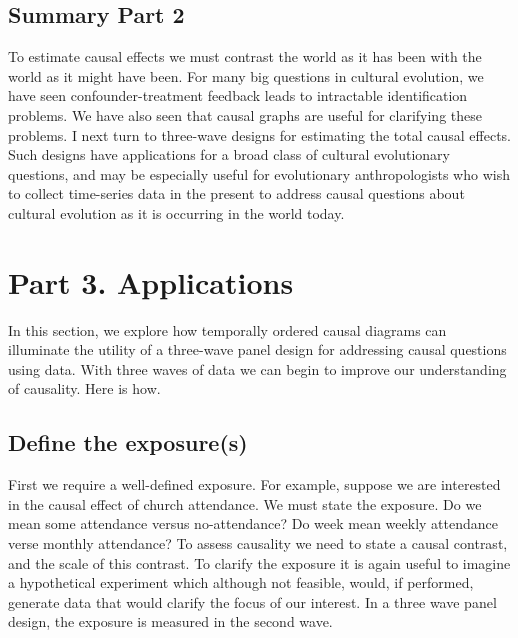 \documentclass[
  singlecolumn]{report}
\begin{document}
\hypertarget{summary-part-2}{%
\subsection{Summary Part 2}\label{summary-part-2}}

To estimate causal effects we must contrast the world as it has been
with the world as it might have been. For many big questions in cultural
evolution, we have seen confounder-treatment feedback leads to
intractable identification problems. We have also seen that causal
graphs are useful for clarifying these problems. I next turn to
three-wave designs for estimating the total causal effects. Such designs
have applications for a broad class of cultural evolutionary questions,
and may be especially useful for evolutionary anthropologists who wish
to collect time-series data in the present to address causal questions
about cultural evolution as it is occurring in the world today.

\hypertarget{part-3.-applications}{%
\section{Part 3. Applications}\label{part-3.-applications}}

In this section, we explore how temporally ordered causal diagrams can
illuminate the utility of a three-wave panel design for addressing
causal questions using data. With three waves of data we can begin to
improve our understanding of causality. Here is how.

\hypertarget{define-the-exposures}{%
\subsection{\texorpdfstring{\textbf{Define the
exposure(s)}}{Define the exposure(s)}}\label{define-the-exposures}}

First we require a well-defined exposure. For example, suppose we are
interested in the causal effect of church attendance. We must state the
exposure. Do we mean some attendance versus no-attendance? Do week mean
weekly attendance verse monthly attendance? To assess causality we need
to state a causal contrast, and the scale of this contrast. To clarify
the exposure it is again useful to imagine a hypothetical experiment
which although not feasible, would, if performed, generate data that
would clarify the focus of our interest. In a three wave panel design,
the exposure is measured in the second wave.
\end{document}
